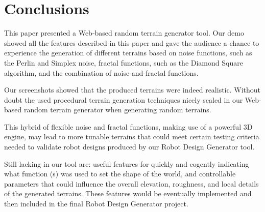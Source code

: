 \section{Conclusions} %
\label{sec:conclusions}

This paper presented a Web-based random terrain generator tool. Our demo showed all the features described in this paper and gave the audience a chance to experience the generation of different terrains based on noise functions, such as the Perlin and Simplex noise, fractal functions, such as the Diamond Square algorithm, and the combination of noise-and-fractal functions. 

Our screenshots showed that the produced terrains were indeed realistic. Without doubt the used procedural terrain generation techniques nicely scaled in our Web-based random terrain generator when generating random terrains. 

This hybrid of flexible noise and fractal functions, making use of a powerful 3D engine, may lead to more tunable terrains that could meet certain testing criteria needed to validate robot designs produced by our Robot Design Generator tool. 

Still lacking in our tool are: useful features for quickly and cogently indicating what function (s) was used to set the shape of the world, and controllable parameters that could influence the overall elevation, roughness, and local details of the generated terrains. These features would be eventually implemented and then included in the final Robot Design Generator project. 


